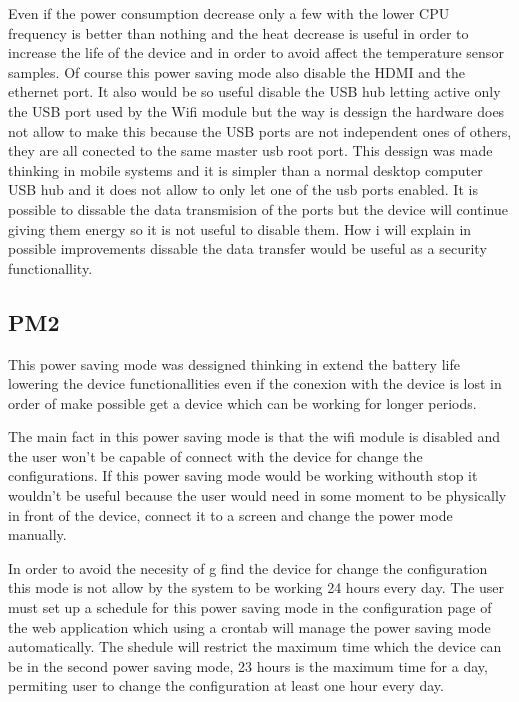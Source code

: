 		Even if the power consumption decrease only a few with the lower CPU frequency is better than nothing and the heat decrease is useful in order to increase the life of the device and in order to avoid affect the temperature sensor samples.
		Of course this power saving mode also disable the HDMI and the ethernet port. It also would be so useful disable the USB hub letting active only the USB port used by the Wifi module but the way is dessign the hardware does not allow to make this because the USB ports are not independent ones of others, they are all conected to the same master usb root port. This dessign was made thinking in mobile systems and it is simpler than a normal desktop computer USB hub and it does not allow to only let one of the usb ports enabled. It is possible to dissable the data transmision of the ports but the device will continue giving them energy so it is not useful to disable them. How i will explain in possible improvements dissable the data transfer would be useful as a security functionallity.

		\subsection{PM2}
		This power saving mode was dessigned thinking in extend the battery life lowering the device functionallities even if the conexion with the device is lost in order of make possible get a device which can be working for longer periods.

		The main fact in this power saving mode is that the wifi module is disabled and the user won't be capable of connect with the device for change the configurations. If this power saving mode would be working withouth stop it wouldn't be useful because the user would need in some moment to be physically in front of the device, connect it to a screen and change the power mode manually.

		In order to avoid the necesity of g find the device for change the configuration this mode is not allow by the system to be working 24 hours every day. The user must set up a schedule for this power saving mode in the configuration page of the web application which using a crontab will manage the power saving mode automatically. The shedule will restrict the maximum time which the device can be in the second power saving mode, 23 hours is the maximum time for a day, permiting user to change the configuration at least one hour every day.

